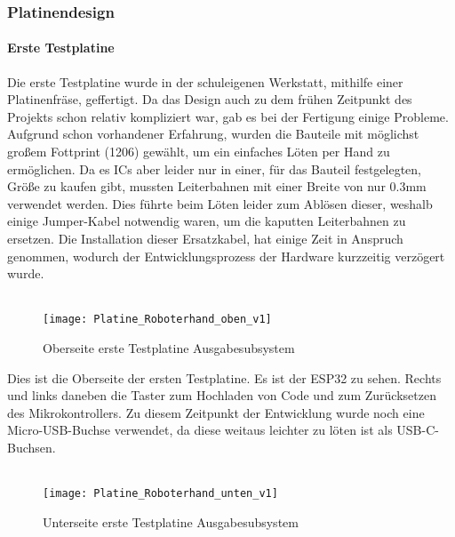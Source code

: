 \documentclass[titlepage,12pt,twoside]{article}
\begin{document}
\subsubsection{Platinendesign}
\label{chap:Platinendesign Roboterhand}
\paragraph{Erste Testplatine}
\hfill \break
\hfill \break
Die erste Testplatine wurde in der schuleigenen Werkstatt, mithilfe einer Platinenfräse, geffertigt. Da das Design auch zu dem frühen Zeitpunkt des Projekts schon relativ kompliziert war, gab es bei der Fertigung einige Probleme.
Aufgrund schon vorhandener Erfahrung, wurden die Bauteile mit möglichst großem Fottprint (1206) gewählt, um ein einfaches Löten per Hand zu ermöglichen. Da es ICs aber leider nur in einer, für das Bauteil festgelegten, Größe zu kaufen gibt,
mussten Leiterbahnen mit einer Breite von nur 0.3mm verwendet werden. Dies führte beim Löten leider zum Ablösen dieser, weshalb einige Jumper-Kabel notwendig waren, um die kaputten Leiterbahnen zu ersetzen. Die Installation dieser 
Ersatzkabel, hat einige Zeit in Anspruch genommen, wodurch der Entwicklungsprozess der Hardware kurzzeitig verzögert wurde. \\
\\ 
\begin{figure}[H]
	\begin{center}
		\scalebox{0.6}
		{\texttt{[image: Platine\_Roboterhand\_oben\_v1]}}
		\caption{Oberseite erste Testplatine Ausgabesubsystem}
		\label{fig:Platine_Roboterhand_oben_v1}		
	\end{center}
\end{figure}
\hfill \break
Dies ist die Oberseite der ersten Testplatine. Es ist der ESP32 zu sehen. Rechts und links daneben die Taster zum Hochladen von Code und zum Zurücksetzen des Mikrokontrollers. Zu diesem Zeitpunkt der Entwicklung wurde noch eine Micro-USB-Buchse
verwendet, da diese weitaus leichter zu löten ist als USB-C-Buchsen. \\
\\
\begin{figure}[H]
	\begin{center}
		\scalebox{0.8}
		{\texttt{[image: Platine\_Roboterhand\_unten\_v1]}}
		\caption{Unterseite erste Testplatine Ausgabesubsystem}
		\label{fig:Platine_Roboterhand_unten_v1}		
	\end{center}
\end{figure}
\end{document}
